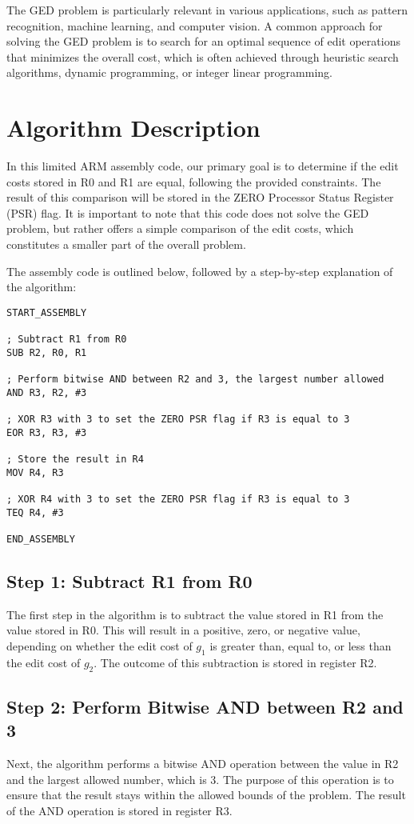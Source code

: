 The GED problem is particularly relevant in various applications, such as pattern recognition, machine learning, and computer vision. A common approach for solving the GED problem is to search for an optimal sequence of edit operations that minimizes the overall cost, which is often achieved through heuristic search algorithms, dynamic programming, or integer linear programming.

\section{Algorithm Description}
In this limited ARM assembly code, our primary goal is to determine if the edit costs stored in R0 and R1 are equal, following the provided constraints. The result of this comparison will be stored in the ZERO Processor Status Register (PSR) flag. It is important to note that this code does not solve the GED problem, but rather offers a simple comparison of the edit costs, which constitutes a smaller part of the overall problem.

The assembly code is outlined below, followed by a step-by-step explanation of the algorithm:

\begin{verbatim}
START_ASSEMBLY

; Subtract R1 from R0
SUB R2, R0, R1

; Perform bitwise AND between R2 and 3, the largest number allowed
AND R3, R2, #3

; XOR R3 with 3 to set the ZERO PSR flag if R3 is equal to 3
EOR R3, R3, #3

; Store the result in R4
MOV R4, R3

; XOR R4 with 3 to set the ZERO PSR flag if R3 is equal to 3
TEQ R4, #3

END_ASSEMBLY
\end{verbatim}

\subsection{Step 1: Subtract R1 from R0}
The first step in the algorithm is to subtract the value stored in R1 from the value stored in R0. This will result in a positive, zero, or negative value, depending on whether the edit cost of $g_1$ is greater than, equal to, or less than the edit cost of $g_2$. The outcome of this subtraction is stored in register R2.

\subsection{Step 2: Perform Bitwise AND between R2 and 3}
Next, the algorithm performs a bitwise AND operation between the value in R2 and the largest allowed number, which is 3. The purpose of this operation is to ensure that the result stays within the allowed bounds of the problem. The result of the AND operation is stored in register R3.

